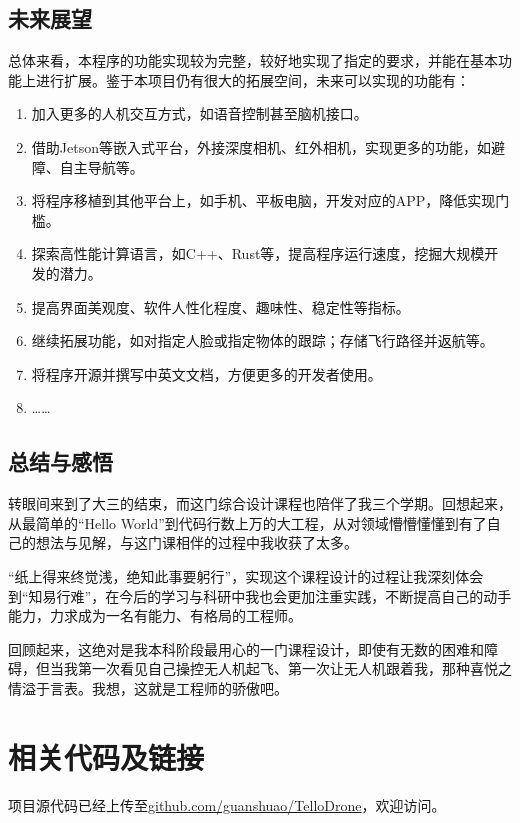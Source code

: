 \documentclass[report, twoside, UTF8, AutoFakeBold = 1, AutoFakeSlant, zihao = -4]{config}
\begin{document}
\section{未来展望}
总体来看，本程序的功能实现较为完整，较好地实现了指定的要求，并能在基本功能上进行扩展。鉴于本项目仍有很大的拓展空间，未来可以实现的功能有：
\begin{enumerate}
    \item 加入更多的人机交互方式，如语音控制甚至脑机接口。
    \item 借助Jetson等嵌入式平台，外接深度相机、红外相机，实现更多的功能，如避障、自主导航等。
    \item 将程序移植到其他平台上，如手机、平板电脑，开发对应的APP，降低实现门槛。
    \item 探索高性能计算语言，如C++、Rust等，提高程序运行速度，挖掘大规模开发的潜力。
    \item 提高界面美观度、软件人性化程度、趣味性、稳定性等指标。
    \item 继续拓展功能，如对指定人脸或指定物体的跟踪；存储飞行路径并返航等。
    \item 将程序开源并撰写中英文文档，方便更多的开发者使用。
    \item ……
\end{enumerate}

\section{总结与感悟}
转眼间来到了大三的结束，而这门综合设计课程也陪伴了我三个学期。回想起来，从最简单的“Hello World”到代码行数上万的大工程，从对领域懵懵懂懂到有了自己的想法与见解，与这门课相伴的过程中我收获了太多。

“纸上得来终觉浅，绝知此事要躬行”，实现这个课程设计的过程让我深刻体会到“知易行难”，在今后的学习与科研中我也会更加注重实践，不断提高自己的动手能力，力求成为一名有能力、有格局的工程师。

回顾起来，这绝对是我本科阶段最用心的一门课程设计，即使有无数的困难和障碍，但当我第一次看见自己操控无人机起飞、第一次让无人机跟着我，那种喜悦之情溢于言表。我想，这就是工程师的骄傲吧。



\StartAppendix %

\chapter{相关代码及链接}

项目源代码已经上传至\href{https://github.com/guanshuao/TelloDrone}{github.com/guanshuao/TelloDrone}，欢迎访问。
\end{document}
